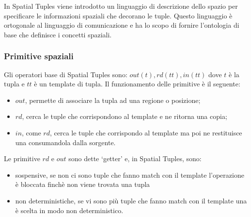 In Spatial Tuples viene introdotto un linguaggio di descrizione dello spazio per specificare le informazioni spaziali che decorano le tuple. Questo linguaggio è ortogonale al linguaggio di comunicazione e ha lo scopo di fornire l'ontologia di base che definisce i concetti spaziali.

\subsubsection{Primitive spaziali}
Gli operatori base di Spatial Tuples sono: $out(t), rd(tt), in(tt)$ dove $t$ è la tupla e $tt$ è un template di tupla. Il funzionamento delle primitive è il seguente:
\begin{itemize}
\item $out$, permette di associare la tupla ad una regione o posizione;
\item $rd$, cerca le tuple che corrispondono al template e ne ritorna una copia;
\item $in$, come $rd$, cerca le tuple che corrispondo al template ma poi ne restituisce una consumandola dalla sorgente.
\end{itemize}
Le primitive $rd$ e $out$ sono dette `getter' e, in Spatial Tuples, sono:
\begin{itemize}
\item sospensive, se non ci sono tuple che fanno match con il template l'operazione è bloccata finchè non viene trovata una tupla
\item non deterministiche, se vi sono più tuple che fanno match con il template una è scelta in modo non deterministico.
\end{itemize}
